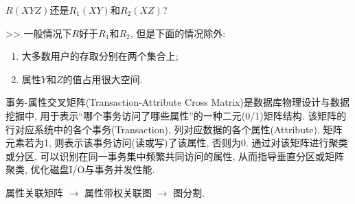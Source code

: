 $R(XYZ)$还是$R_1(XY)$和$R_2(XZ)$?

>> 一般情况下$R$好于$R_1$和$R_2$, 但是下面的情况除外:
\begin{enumerate}
    \item 大多数用户的存取分别在两个集合上;
    \item 属性$Y$和$Z$的值占用很大空间.
\end{enumerate}

事务-属性交叉矩阵(Transaction-Attribute Cross Matrix)是数据库物理设计与数据挖掘中, 
用于表示“哪个事务访问了哪些属性”的一种二元(0/1)矩阵结构. 
该矩阵的行对应系统中的各个事务(Transaction), 
列对应数据的各个属性(Attribute), 矩阵元素若为1, 则表示该事务访问(读或写)了该属性, 否则为0. 
通过对该矩阵进行聚类或分区, 可以识别在同一事务集中频繁共同访问的属性, 
从而指导垂直分区或矩阵聚类, 优化磁盘I/O与事务并发性能.

属性关联矩阵 $\to$ 属性带权关联图 $\to$ 图分割.
